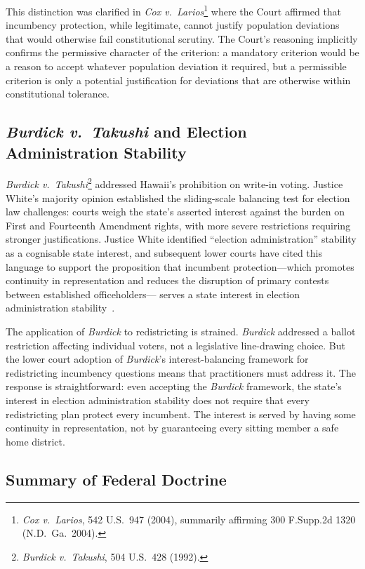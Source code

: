 This distinction was clarified in \textit{Cox v.\ Larios}\footnote{\textit{Cox v.\
Larios}, 542 U.S.\ 947 (2004), summarily affirming 300 F.Supp.2d 1320 (N.D.\ Ga.\
2004).} where the Court affirmed that incumbency protection, while legitimate, cannot
justify population deviations that would otherwise fail constitutional scrutiny.
The Court's reasoning implicitly confirms the permissive character of the criterion:
a mandatory criterion would be a reason to accept whatever population deviation it
required, but a permissible criterion is only a potential justification for deviations
that are otherwise within constitutional tolerance.

\subsection{\textit{Burdick v.\ Takushi} and Election Administration Stability}

\textit{Burdick v.\ Takushi}\footnote{\textit{Burdick v.\ Takushi}, 504 U.S.\ 428
(1992).} addressed Hawaii's prohibition on write-in voting. Justice White's majority
opinion established the sliding-scale balancing test for election law challenges:
courts weigh the state's asserted interest against the burden on First and Fourteenth
Amendment rights, with more severe restrictions requiring stronger justifications.
Justice White identified ``election administration'' stability as a cognisable state
interest, and subsequent lower courts have cited this language to support the
proposition that incumbent protection---which promotes continuity in representation
and reduces the disruption of primary contests between established officeholders---
serves a state interest in election administration stability~\citep{pildes2002foreword}.

The application of \textit{Burdick} to redistricting is strained. \textit{Burdick}
addressed a ballot restriction affecting individual voters, not a legislative line-drawing
choice. But the lower court adoption of \textit{Burdick}'s interest-balancing framework
for redistricting incumbency questions means that practitioners must address it.
The response is straightforward: even accepting the \textit{Burdick} framework,
the state's interest in election administration stability does not require that every
redistricting plan protect every incumbent. The interest is served by having some
continuity in representation, not by guaranteeing every sitting member a safe home
district.

\subsection{Summary of Federal Doctrine}

